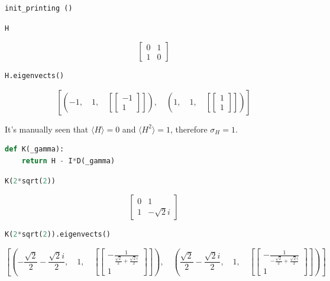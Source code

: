 \begin{lstlisting}[language=Python]
init_printing ()
\end{lstlisting}

\begin{lstlisting}[language=Python]
H
\end{lstlisting}

\[\left[\begin{matrix}0 & 1\\1 & 0\end{matrix}\right]\]

\begin{lstlisting}[language=Python]
H.eigenvects()
\end{lstlisting}

\[\left [ \left ( -1, \quad 1, \quad \left [ \left[\begin{matrix}-1\\1\end{matrix}\right]\right ]\right ), \quad \left ( 1, \quad 1, \quad \left [ \left[\begin{matrix}1\\1\end{matrix}\right]\right ]\right )\right ]\]

It's manually seen that \(\langle H \rangle = 0\) and
\(\langle H^2 \rangle = 1\), therefore \(\sigma_{H} = 1\).

\begin{lstlisting}[language=Python]
def K(_gamma):
    return H - I*D(_gamma)
\end{lstlisting}

\begin{lstlisting}[language=Python]
K(2*sqrt(2))
\end{lstlisting}

\[\left[\begin{matrix}0 & 1\\1 & - \sqrt{2} i\end{matrix}\right]\]

\begin{lstlisting}[language=Python]
K(2*sqrt(2)).eigenvects()
\end{lstlisting}

\[\left [ \left ( - \frac{\sqrt{2}}{2} - \frac{\sqrt{2} i}{2}, \quad 1, \quad \left [ \left[\begin{matrix}- \frac{1}{\frac{\sqrt{2}}{2} + \frac{\sqrt{2} i}{2}}\\1\end{matrix}\right]\right ]\right ), \quad \left ( \frac{\sqrt{2}}{2} - \frac{\sqrt{2} i}{2}, \quad 1, \quad \left [ \left[\begin{matrix}- \frac{1}{- \frac{\sqrt{2}}{2} + \frac{\sqrt{2} i}{2}}\\1\end{matrix}\right]\right ]\right )\right ]\]

